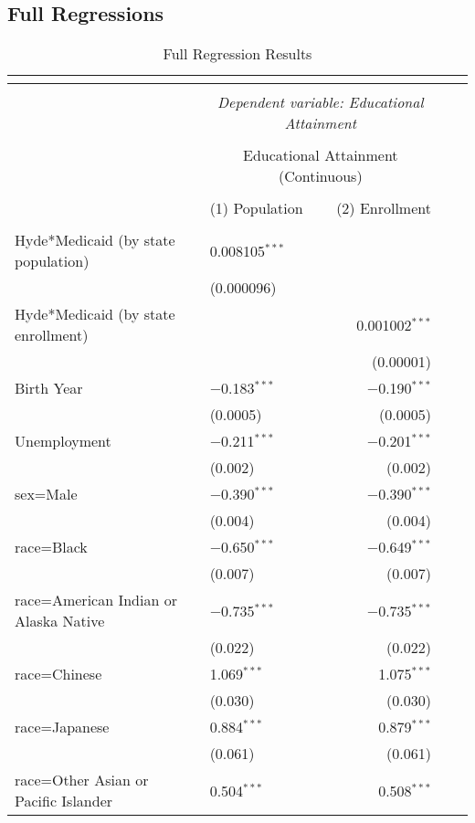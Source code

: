 \subsection{Full Regressions}
    \begingroup\tiny
    \begin{longtable}{ll|rrr}
    \caption{Full Regression Results} \\
    \label{app_full_reg} 
    \\ [-4ex]\hline 
    \hline \\[-4ex] 
    & \multicolumn{2}{c}{\textit{Dependent variable: Educational Attainment}} \\ 
    \cline{2-3} 
    \\[-4ex] & \multicolumn{2}{c}{Educational Attainment (Continuous)} \\ 
    \\[-4ex] & (1) Population & (2) Enrollment\\ 
    \hline \\[-4ex] 
        Hyde*Medicaid (by state population) & 0.008105$^{***}$ &  \\ 
        & (0.000096) &  \\ 
        Hyde*Medicaid (by state enrollment) &  & 0.001002$^{***}$ \\ 
        &  & (0.00001) \\  
        Birth Year & $-$0.183$^{***}$ & $-$0.190$^{***}$ \\ 
        & (0.0005) & (0.0005) \\ 
        Unemployment & $-$0.211$^{***}$ & $-$0.201$^{***}$ \\ 
        & (0.002) & (0.002) \\ 
        sex=Male & $-$0.390$^{***}$ & $-$0.390$^{***}$ \\ 
        & (0.004) & (0.004) \\
        race=Black & $-$0.650$^{***}$ & $-$0.649$^{***}$ \\ 
        & (0.007) & (0.007) \\ 
        race=American Indian or Alaska Native & $-$0.735$^{***}$ & $-$0.735$^{***}$ \\ 
        & (0.022) & (0.022) \\ 
        race=Chinese & 1.069$^{***}$ & 1.075$^{***}$ \\ 
        & (0.030) & (0.030) \\ 
        race=Japanese & 0.884$^{***}$ & 0.879$^{***}$ \\ 
        & (0.061) & (0.061) \\ 
        race=Other Asian or Pacific Islander & 0.504$^{***}$ & 0.508$^{***}$ \\

\end{longtable}
